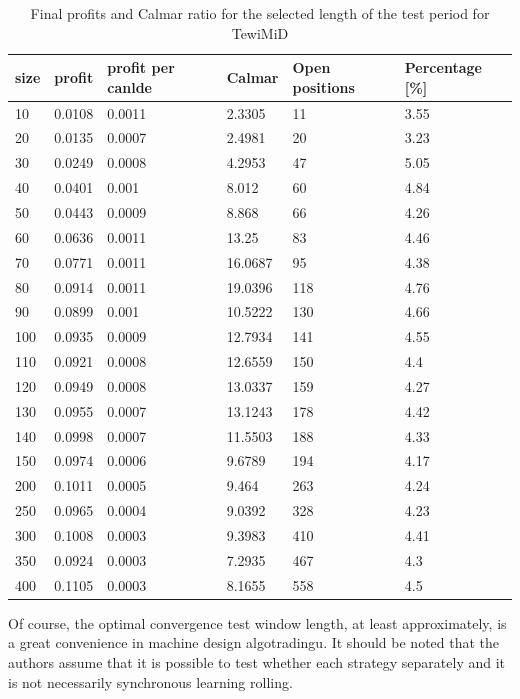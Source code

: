 \documentclass{tewiart}
\begin{document}
\begin{table}[h!]
\caption{Final profits and Calmar ratio for the selected length of the test period for TewiMiD}
\scriptsize
\label{table2}
\begin{center}
 \begin{tabular}{|l|l|l|l|l|l|} 
 \hline size & profit & profit per canlde & Calmar & Open positions & Percentage [\%]\\ \hline  
10 & 0.0108 & 0.0011 & 2.3305 & 11 & 3.55 \\ 
 20 & 0.0135 & 0.0007 & 2.4981 & 20 & 3.23 \\ 
 30 & 0.0249 & 0.0008 & 4.2953 & 47 & 5.05 \\ 
 40 & 0.0401 & 0.001 & 8.012 & 60 & 4.84 \\ 
 50 & 0.0443 & 0.0009 & 8.868 & 66 & 4.26 \\ 
 60 & 0.0636 & 0.0011 & 13.25 & 83 & 4.46 \\ 
 70 & 0.0771 & 0.0011 & 16.0687 & 95 & 4.38 \\ 
 80 & 0.0914 & 0.0011 & 19.0396 & 118 & 4.76 \\ 
 90 & 0.0899 & 0.001 & 10.5222 & 130 & 4.66 \\ 
 100 & 0.0935 & 0.0009 & 12.7934 & 141 & 4.55 \\ 
 110 & 0.0921 & 0.0008 & 12.6559 & 150 & 4.4 \\ 
 120 & 0.0949 & 0.0008 & 13.0337 & 159 & 4.27 \\ 
 130 & 0.0955 & 0.0007 & 13.1243 & 178 & 4.42 \\ 
 140 & 0.0998 & 0.0007 & 11.5503 & 188 & 4.33 \\ 
 150 & 0.0974 & 0.0006 & 9.6789 & 194 & 4.17 \\ 
 200 & 0.1011 & 0.0005 & 9.464 & 263 & 4.24 \\ 
 250 & 0.0965 & 0.0004 & 9.0392 & 328 & 4.23 \\ 
 300 & 0.1008 & 0.0003 & 9.3983 & 410 & 4.41 \\ 
 350 & 0.0924 & 0.0003 & 7.2935 & 467 & 4.3 \\ 
 400 & 0.1105 & 0.0003 & 8.1655 & 558 & 4.5 \\ 
 \hline \end{tabular} 
\end{center}
 \end{table}
 \FloatBarrier
Of course, the optimal convergence test window length, at least approximately, is a great convenience in machine design algotradingu. It should be noted that the authors assume that it is possible to test whether each strategy separately and it is not necessarily synchronous learning rolling.\\
\end{document}
